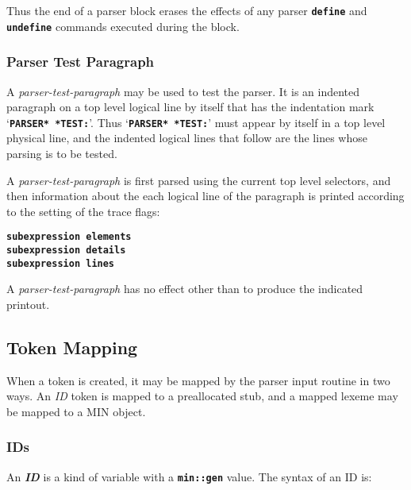 \documentclass[12pt]{article}
\newcommand{\TT}[1]{{\tt \bfseries #1}}
\newcommand{\key}[1]{{\bf \em #1}\index{#1}}
\begin{document}
Thus the end of a parser block erases the effects of any
parser \TT{define} and \TT{undefine} commands executed during the block.

\subsubsection{Parser Test Paragraph}
\label{PARSER-TEST-PARAGRAPH}

A {\em parser-test-paragraph} may be used to test the parser.
It is an indented paragraph on a top level logical line by itself
that has the indentation mark `\TT{*PARSER* *TEST:}'.
Thus `\TT{*PARSER* *TEST:}' must appear by itself in a top level
physical line, and the indented logical lines that follow are the
lines whose parsing is to be tested.

A {\em parser-test-paragraph} is first parsed using the current top
level selectors, and then information about the each logical line
of the paragraph is printed according to the setting of the
trace flags:
\begin{center}
\TT{subexpression elements} \\
\TT{subexpression details} \\
\TT{subexpression lines} \\
\end{center}

A {\em parser-test-paragraph} has no effect other than to produce
the indicated printout.

\subsection{Token Mapping}

When a token is created, it may be mapped by the parser input
routine in two ways.  An {\em ID} token is mapped to a preallocated
stub, and a mapped lexeme may be mapped to a MIN object.

\subsubsection{IDs}
\label{IDS}

An \key{ID} is a kind of variable with a \TT{min::gen} value.
The syntax of an ID is:
\end{document}
